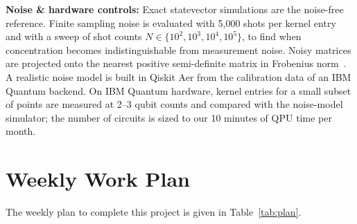 \documentclass[conference]{IEEEtran}
\begin{document}
\textbf{Noise \& hardware controls:} Exact statevector simulations are the noise-free reference. Finite sampling noise is evaluated with 5{,}000 shots per kernel entry~\cite{shaydulin2022bandwidth} and with a sweep of shot counts $N\in\{10^{2},10^{3},10^{4},10^{5}\}$, to find when concentration becomes indistinguishable from measurement noise. Noisy matrices are projected onto the nearest positive semi-definite matrix in Frobenius norm~\cite{shaydulin2022bandwidth}. A realistic noise model is built in Qiskit Aer from the calibration data of an IBM Quantum backend. On IBM Quantum hardware, kernel entries for a small subset of points are measured at 2--3 qubit counts and compared with the noise-model simulator; the number of circuits is sized to our 10 minutes of QPU time per month.

\section{Weekly Work Plan}
The weekly plan to complete this project is given in Table~\ref{tab:plan}.



\end{document}
